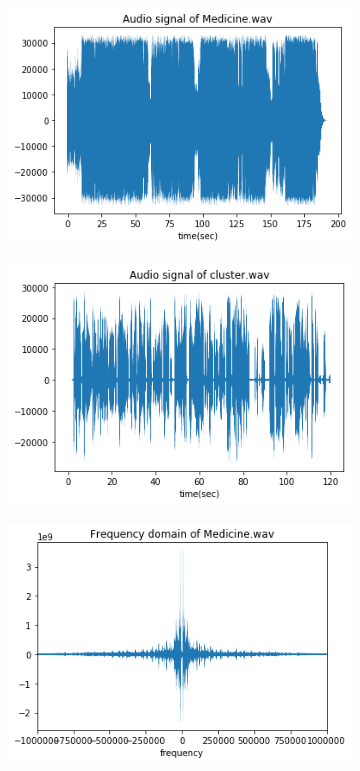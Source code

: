 \documentclass{article}
\begin{document}
\begin{figure}[h!]
\centering
    \begin{subfigure}{0.45\textwidth}
      \includegraphics[width=\textwidth]{Medicine_original.png}
    \end{subfigure}%
    \begin{subfigure}{0.45\textwidth}
      \includegraphics[width=\textwidth]{Cluster_original.png}
    \end{subfigure}
    \begin{subfigure}{0.45\textwidth}
      \includegraphics[width=\textwidth]{Medicine_freq.png}

\end{subfigure}
\end{figure}
\end{document}
